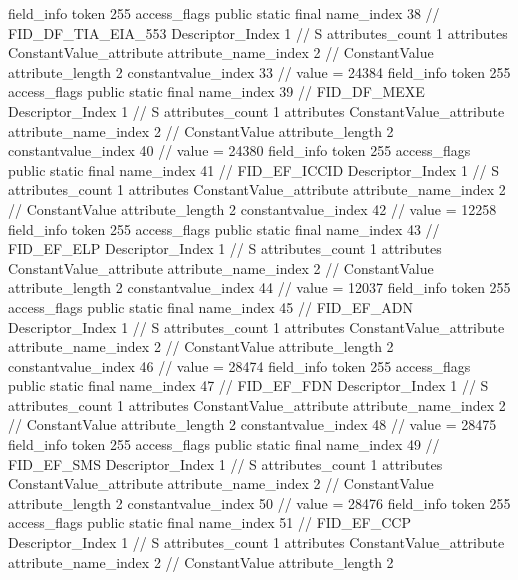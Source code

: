 {{{{{{				}
			}
			field_info {
				token	255
				access_flags	public static final
				name_index	38		// FID_DF_TIA_EIA_553
				Descriptor_Index	1		// S
				attributes_count	1
				attributes {
				ConstantValue_attribute {
					attribute_name_index	2		// ConstantValue
					attribute_length	2
					constantvalue_index	33		// value = 24384
				}
				}
			}
			field_info {
				token	255
				access_flags	public static final
				name_index	39		// FID_DF_MEXE
				Descriptor_Index	1		// S
				attributes_count	1
				attributes {
				ConstantValue_attribute {
					attribute_name_index	2		// ConstantValue
					attribute_length	2
					constantvalue_index	40		// value = 24380
				}
				}
			}
			field_info {
				token	255
				access_flags	public static final
				name_index	41		// FID_EF_ICCID
				Descriptor_Index	1		// S
				attributes_count	1
				attributes {
				ConstantValue_attribute {
					attribute_name_index	2		// ConstantValue
					attribute_length	2
					constantvalue_index	42		// value = 12258
				}
				}
			}
			field_info {
				token	255
				access_flags	public static final
				name_index	43		// FID_EF_ELP
				Descriptor_Index	1		// S
				attributes_count	1
				attributes {
				ConstantValue_attribute {
					attribute_name_index	2		// ConstantValue
					attribute_length	2
					constantvalue_index	44		// value = 12037
				}
				}
			}
			field_info {
				token	255
				access_flags	public static final
				name_index	45		// FID_EF_ADN
				Descriptor_Index	1		// S
				attributes_count	1
				attributes {
				ConstantValue_attribute {
					attribute_name_index	2		// ConstantValue
					attribute_length	2
					constantvalue_index	46		// value = 28474
				}
				}
			}
			field_info {
				token	255
				access_flags	public static final
				name_index	47		// FID_EF_FDN
				Descriptor_Index	1		// S
				attributes_count	1
				attributes {
				ConstantValue_attribute {
					attribute_name_index	2		// ConstantValue
					attribute_length	2
					constantvalue_index	48		// value = 28475
				}
				}
			}
			field_info {
				token	255
				access_flags	public static final
				name_index	49		// FID_EF_SMS
				Descriptor_Index	1		// S
				attributes_count	1
				attributes {
				ConstantValue_attribute {
					attribute_name_index	2		// ConstantValue
					attribute_length	2
					constantvalue_index	50		// value = 28476
				}
				}
			}
			field_info {
				token	255
				access_flags	public static final
				name_index	51		// FID_EF_CCP
				Descriptor_Index	1		// S
				attributes_count	1
				attributes {
				ConstantValue_attribute {
					attribute_name_index	2		// ConstantValue
					attribute_length	2
}}}}}}}
